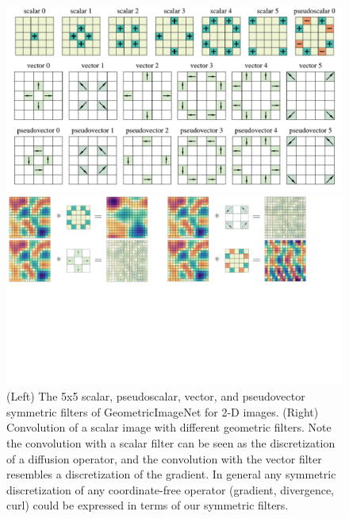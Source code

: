 \documentclass[11pt]{article}
\begin{document}
\begin{figure}
    \centering
    \begin{minipage}{0.37\textwidth}
    \includegraphics[width=\textwidth]{figures/filters_m5.pdf}
    \end{minipage}
    \begin{minipage}{0.62\textwidth}
    \includegraphics[width=\textwidth]{figures/convs.pdf}
    \end{minipage}
    \caption{(Left) The 5x5 scalar, pseudoscalar, vector, and pseudovector symmetric filters of GeometricImageNet for 2-D images. (Right) Convolution of a scalar image with different geometric filters. Note the convolution with a scalar filter can be seen as the discretization of a diffusion operator, and the convolution with the vector filter resembles a discretization of the gradient. In general any symmetric discretization of any coordinate-free operator (gradient, divergence, curl) could be expressed in terms of our symmetric filters.}
    \label{fig.GINet}
\end{figure}
\end{document}
